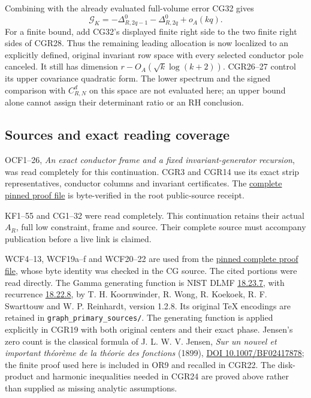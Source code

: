 Combining with the already evaluated full-volume error CG32 gives \[
\boxed{\mathcal G_K
=-\Delta_{R,2q-1}^0-\Delta_{R,2q}^0+o_A(kq).}
\tag{CGR29}
\] For a finite bound, add CG32's displayed finite right side to the two finite right sides of CGR28. Thus the remaining leading allocation is now localized to an explicitly defined, original invariant row space with every selected conductor pole canceled. It still has dimension \(r-O_A(\sqrt{k}\log(k+2))\). CGR26--27 control its upper covariance quadratic form. The lower spectrum and the signed comparison with \(C_{R,N}^d\) on this space are not evaluated here; an upper bound alone cannot assign their determinant ratio or an RH conclusion.

\subsection{Sources and exact reading coverage}\label{sources-and-exact-reading-coverage}

OCF1--26, \emph{An exact conductor frame and a fixed invariant-generator recursion}, was read completely for this continuation. CGR3 and CGR14 use its exact strip representatives, conductor columns and invariant certificates. The \href{https://github.com/KokunoYumeto/zeta-function-research-reader/blob/5992ad50c0f2a06921f1fcaded7b4e38097c0739/workbenches/splitzero-tandem/continuations/20260920-original-kernel-mixed-determinants/providers/ORIGINAL_CONDUCTOR_STRIP_FRAME.tex\#L27}{complete pinned proof file} is byte-verified in the root public-source receipt.

KF1--55 and CG1--32 were read completely. This continuation retains their actual \(A_R\), full low constraint, frame and source. Their complete source must accompany publication before a live link is claimed.

WCF4--13, WCF19a--f and WCF20--22 are used from the \href{https://github.com/KokunoYumeto/zeta-function-research-reader/blob/52274804051e325c8a6ef69c17b3958cc2caba0a/workbenches/splitzero-tandem/continuations/20260920-gamma-and-finite-derivative/providers/WEIGHTED_CONDUCTOR_FORWARD.tex}{pinned complete proof file}, whose byte identity was checked in the CG source. The cited portions were read directly. The Gamma generating function is NIST DLMF \href{https://dlmf.nist.gov/18.23.E7}{18.23.7}, with recurrence \href{https://dlmf.nist.gov/18.22.E8}{18.22.8}, by T. H. Koornwinder, R. Wong, R. Koekoek, R. F. Swarttouw and W. P. Reinhardt, version 1.2.8. Its original TeX encodings are retained in \nolinkurl{graph_primary_sources/}. The generating function is applied explicitly in CGR19 with both original centers and their exact phase. Jensen's zero count is the classical formula of J. L. W. V. Jensen, \emph{Sur un nouvel et important théorème de la théorie des fonctions} (1899), \href{https://doi.org/10.1007/BF02417878}{DOI 10.1007/BF02417878}; the finite proof used here is included in OR9 and recalled in CGR22. The disk-product and harmonic inequalities needed in CGR24 are proved above rather than supplied as missing analytic assumptions.

